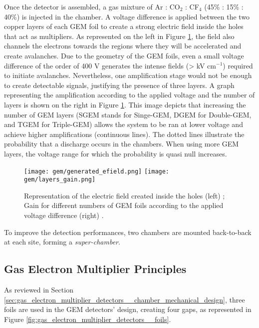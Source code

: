             Once the detector is assembled, a gas mixture of Ar : CO$ _2 $ : CF$ _4 $ (45\% : 15\% : 40\%) is injected in the chamber. A voltage difference is applied between the two copper layers of each GEM foil to create a strong electric field inside the holes that act as multipliers. As represented on the left in Figure \ref{fig:gas_electron_multiplier_detectors__field_gain}, the field also channels the electrons towards the regions where they will be accelerated and create avalanches. Due to the geometry of the GEM foils, even a small voltage difference of the order of 400 V generates the intense fields (> kV cm$ ^{-1} $) required to initiate avalanches. Nevertheless, one amplification stage would not be enough to create detectable signals, justifying the presence of three layers. A graph representing the amplification according to the applied voltage and the number of layers is shown on the right in Figure \ref{fig:gas_electron_multiplier_detectors__field_gain}. This image depicts that increasing the number of GEM layers (SGEM stands for Singe-GEM, DGEM for Double-GEM, and TGEM for Triple-GEM) allows the system to be ran at lower voltage and achieve higher amplifications (continuous lines). The dotted lines illustrate the probability that a discharge occurs in the chambers. When using more GEM layers, the voltage range for which the probability is quasi null increases.

            \begin{figure}[h!]
                \centering
                \texttt{[image: gem/generated\_efield.png]}
                \texttt{[image: gem/layers\_gain.png]}
                \caption{Representation of the electric field created inside the holes (left) \Cite{GEM_Electric_Field}; Gain for different numbers of GEM foils according to the applied voltage difference (right) \Cite{Thesis_Laura}.}
                \label{fig:gas_electron_multiplier_detectors__field_gain}
            \end{figure}    

            To improve the detection performances, two chambers are mounted back-to-back at each site, forming a \emph{super-chamber}.

        \subsection{Gas Electron Multiplier Principles}

            As reviewed in Section \ref{sec:gas_electron_multiplier_detectors__chamber_mechanical_design}, three foils are used in the GEM detectors' design, creating four gaps, as represented in Figure \ref{fig:gas_electron_multiplier_detectors__foils}.

